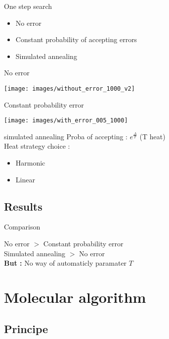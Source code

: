 \documentclass[11pt]{beamer}
\begin{document}
\begin{frame}{One step search}
\begin{itemize}
	\item No error
	\item Constant probability of accepting errors
	\item Simulated annealing
\end{itemize}
\end{frame}

\begin{frame}{No error}

\texttt{[image: images/without\_error\_1000\_v2]}

\end{frame}

\begin{frame}{Constant probability error}

\texttt{[image: images/with\_error\_005\_1000]}

\end{frame}


\begin{frame}{simulated annealing}
Proba of accepting : $e^{\frac{\Delta}{T}}$ (T heat)\\
Heat strategy choice : \\
\begin{itemize}
	\item Harmonic 
	\item Linear
\end{itemize}
\end{frame}

\subsection{Results}

\begin{frame}{Comparison}

No error $>$ Constant probability error\\
Simulated annealing $>$ No error \\
\textbf{But : } No way of automaticly paramater $T$ 

\end{frame}


\section{Molecular algorithm}

\subsection{Principe}
\end{document}
